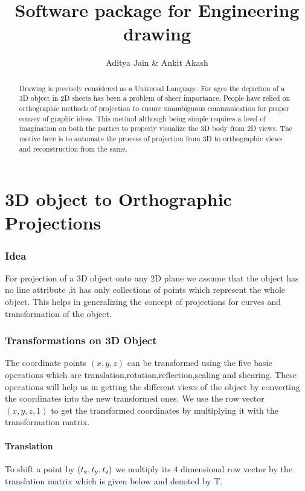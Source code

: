 \documentclass{article}
\begin{document}
\title{Software package for Engineering drawing}
\author{Aditya Jain \& Ankit Akash}

\maketitle

\begin{abstract}
Drawing is precisely considered as a Universal Language. For ages the depiction of a 3D object in 2D sheets has been a problem of sheer importance. People have relied on orthographic methods of projection to ensure unambiguous communication for proper convey of graphic ideas. This method although being simple requires a level of imagination on both the parties to properly visualize the 3D body from 2D views. The motive here is to automate the process of projection from 3D to orthographic views and reconstruction from the same.
\end{abstract}





\part{3D object to Orthographic Projections}

\section*{Idea}
For projection of a 3D object onto any 2D plane we assume that the object has no line attribute ,it has only collections of points which represent the whole object. This helps in generalizing the concept of projections for curves and transformation of the object.

\section{Transformations on 3D Object}
The coordinate points \((x,y,z)\) can be transformed using the five basic operations which are translation,rotation,reflection,scaling and shearing. These operations will help us in getting the different views of the object by converting the coordinates into the new transformed ones. 
We use the row vector \((x,y,z,1)\) to get the transformed coordinates by multiplying it with the transformation matrix.

\subsection{Translation}
To shift a point by \((t\textsubscript{x},t\textsubscript{y},t\textsubscript{z})\) we multiply its \(4\) dimensional row vector by the translation matrix which is given below and denoted by T.
\end{document}
